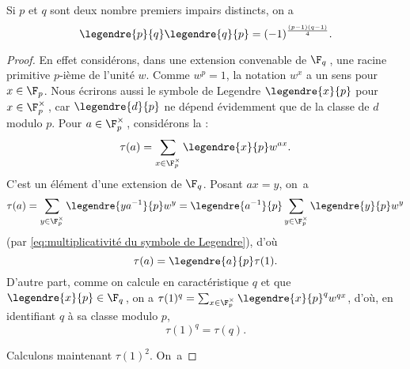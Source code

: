 \documentclass[11pt, %
  title in boldface,
  theorem in new line,
  theorem numbering = section,
  number theorems separately,
  simple name,
]{beaulivre}
\begin{document}
    \begin{theorem}\label{thm:loi de réciprocité quadratique}
        Si \( p \) et \( q \) sont deux nombre premiers impairs distincts, on a
        \[
            \legendre{p}{q} \legendre{q}{p} = (-1)^{\frac{(p-1)(q-1)}{4}}.
        \]
    \end{theorem}
    \vspace{-.5\baselineskip}
    \begin{proof}
        En effet considérons, dans une extension convenable de \( \F_q \)\,, une racine primitive \( p \)‑ième de l'unité \( w \). Comme \( w^p = 1 \), la notation \( w^x \) a un sens pour \( x \in \F_p \). Nous écrirons aussi le symbole de Legendre \( \legendre{x}{p} \) pour \( x \in \F_p^\times \)\,, car \( \legendre{d}{p} \) ne dépend évidemment que de la classe de \( d \) modulo \( p \). Pour \( a \in \F_p^\times \)\,, considérons la  :
        \begin{equation}
            \tau(a) = \sum_{x \in \F_p^\times} \legendre{x}{p} w^{ax}.
        \end{equation}
        C'est un élément d'une extension de \( \F_q \). Posant \( ax = y \), on~a
        \[
            \tau(a) = \sum_{y \in \F_p^\times} \legendre{ya^{-1}}{p} w^y = \legendre{a^{-1}}{p} \sum_{y \in \F_p^\times} \legendre{y}{p} w^y
        \]
        (par \eqref{eq:multiplicativité du symbole de Legendre}), d'où
        \vspace{-.2\baselineskip}%
        \begin{equation}\label{eq:somme de Gauss;relation entre a et 1}
            \tau(a) = \legendre{a}{p} \tau(1).
        \end{equation}
        D'autre part, comme on calcule en caractéristique \( q \) et que \( \legendre{x}{p} \in \F_q \)\,, on a \( \tau(1)^q = \sum_{x \in \F_p^\times} \legendre{x}{p}^q w^{qx} \), d'où, en identifiant \( q \) à sa classe modulo \( p \),
        \vspace{-.2\baselineskip}%
        \begin{equation}\label{eq:somme de Gauss;relation entre q et 1}
            \tau(1)^q = \tau(q).
        \end{equation}
        \vspace{-1.2\baselineskip}\par\noindent%
        Calculons maintenant \( \tau(1)^2 \). On~a

\end{proof}
\end{document}

